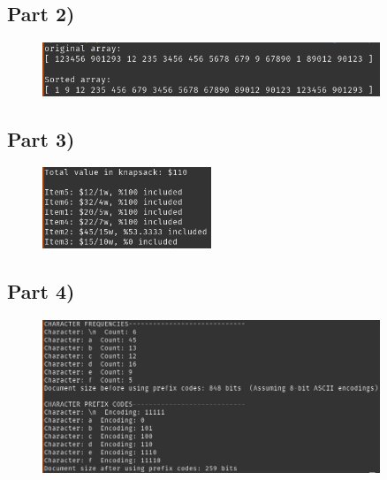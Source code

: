 \documentclass{article}
\begin{document}
    \subsection*{Part 2)}

    \begin{center}
        \begin{minipage}[t]{1\textwidth}
            \begin{figure}[H]
                \centering
                \includegraphics[width=0.9\textwidth, height=0.1\textheight]{./p2.png}
            \end{figure}
        \end{minipage}
    \end{center}

    \subsection*{Part 3)}

    \begin{center}
        \begin{minipage}[t]{1\textwidth}
            \begin{figure}[H]
                \centering
                \includegraphics[width=0.45\textwidth, height=0.15\textheight]{./p3.png}
            \end{figure}
        \end{minipage}
    \end{center}

    \subsection*{Part 4)}

    \begin{center}
        \begin{minipage}[t]{1\textwidth}
            \begin{figure}[H]
                \centering
                \includegraphics[width=0.9\textwidth, height=0.3\textheight]{./p4.png}
            \end{figure}
        \end{minipage}
    \end{center}
\end{document}
